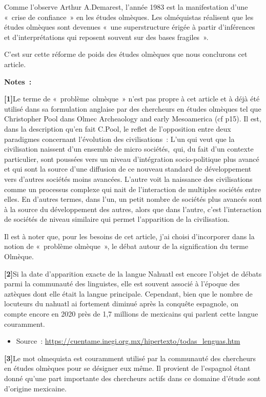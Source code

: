 \documentclass[11pt,a4paper]{article}
\begin{document}
Comme l'observe Arthur A.Demarest, l'année 1983 est la manifestation d'une «~crise de confiance~» en les études olmèques. Les olméquistas réalisent que les études olmèques sont devenues «~une superstructure érigée à partir d'inférences et d'interprétations qui reposent souvent sur des bases fragiles~».

C'est sur cette réforme de poids des études olmèques que nous conclurons cet article.

\textbf{Notes~:}

\textbf{{[}1{]}}Le terme de «~problème~olmèque~» n'est pas propre à cet article et à déjà été utilisé dans sa formulation anglaise par des chercheurs en études olmèques tel que Christopher Pool dans Olmec Archeaology and early Mesoamerica (cf p15). Il est, dans la description qu'en fait C.Pool, le reflet de l'opposition entre deux paradigmes concernant l'évolution des civilisations~: L'un qui veut que la civilisation naissent d'un ensemble de micro sociétés,~qui, du fait d'un contexte particulier, sont poussées vers un niveau d'intégration socio-politique plus avancé et qui sont la source d'une diffusion de ce nouveau standard de développement vers d'autres sociétés moins avancées. L'autre voit la naissance des civilisations comme un processus complexe qui nait de l'interaction de multiples sociétés entre elles. En d'autres termes, dans l'un, un petit nombre de sociétés plus avancés sont à la source du développement des autres, alors que dans l'autre, c'est l'interaction de sociétés de niveau similaire qui permet l'apparition de la civilisation.

Il est à noter que, pour les besoins de cet article, j'ai choisi d'incorporer dans la notion de «~problème olmèque~», le débat autour de la signification du terme Olmèque.

\textbf{{[}2{]}}Si la date d'apparition exacte de la langue Nahuatl est encore l'objet de débats parmi la communauté des linguistes, elle est souvent associé à l'époque des aztèques dont elle était la langue principale. Cependant, bien que le nombre de locuteurs du nahuatl ai fortement diminué après la conquête espagnole, on compte encore en 2020 près de 1,7 millions de mexicains qui parlent cette langue couramment.

\begin{itemize}
\item
  Source~: \url{https://cuentame.inegi.org.mx/hipertexto/todas_lenguas.htm}
\end{itemize}

\textbf{{[}3{]}}Le mot olmequista est couramment utilisé par la communauté des chercheurs en études olmèques pour se désigner eux même. Il provient de l'espagnol étant donné qu'une part importante des chercheurs actifs dans ce domaine d'étude sont d'origine mexicaine.
\end{document}
